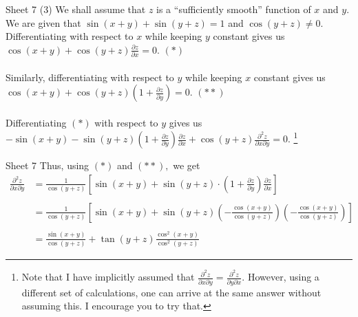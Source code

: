 \documentclass[handout]{beamer}
\begin{document}

\begin{frame}{Sheet 7}
	(3) We shall assume that $z$ is a ``sufficiently smooth'' function of $x$ and $y.$\\
	We are given that $\sin (x+y)+\sin (y+z)=1$ and $\cos (y+z) \neq 0.$\\ 
	Differentiating with respect to $x$ while keeping $y$ constant gives us $\cos (x+y)+\cos (y+z) \frac{\partial z}{\partial x}=0.$ \hfill $(*)$\\~\\
	Similarly, differentiating with respect to $y$ while keeping $x$ constant gives us $\cos (x+y)+\cos (y+z)\left(1+\frac{\partial z}{\partial y}\right)=0.$ \hfill $(**)$\\~\\
	Differentiating $(*)$ with respect to $y$ gives us $-\sin (x+y)-\sin (y+z)\left(1+\frac{\partial z}{\partial y}\right) \frac{\partial z}{\partial x}+\cos (y+z) \frac{\partial^{2} z}{\partial x \partial y}=0.$ \footnote{Note that I have implicitly assumed that $\frac{\partial^2z}{\partial x\partial y} = \frac{\partial^2z}{\partial y\partial x}.$ However, using a different set of calculations, one can arrive at the same answer without assuming this. I encourage you to try that.}
\end{frame}
\begin{frame}{Sheet 7}
	Thus, using $(*)$ and $(**),$ we get
	\begin{align*} \frac{\partial^{2} z}{\partial x \partial y} &=\frac{1}{\cos (y+z)}\left[\sin (x+y)+\sin (y+z) \cdot\left(1+\frac{\partial z}{\partial y}\right) \frac{\partial z}{\partial x}\right] \\~\\ &=\frac{1}{\cos (y+z)}\left[\sin (x+y)+\sin (y+z)\left(-\frac{\cos (x+y)}{\cos (y+z)}\right)\left(-\frac{\cos (x+y)}{\cos (y+z)}\right)\right] \\~\\ &=\frac{\sin (x+y)}{\cos (y+z)}+\tan (y+z) \frac{\cos ^{2}(x+y)}{\cos ^{2}(y+z)} \end{align*}
\end{frame}
\end{document}

